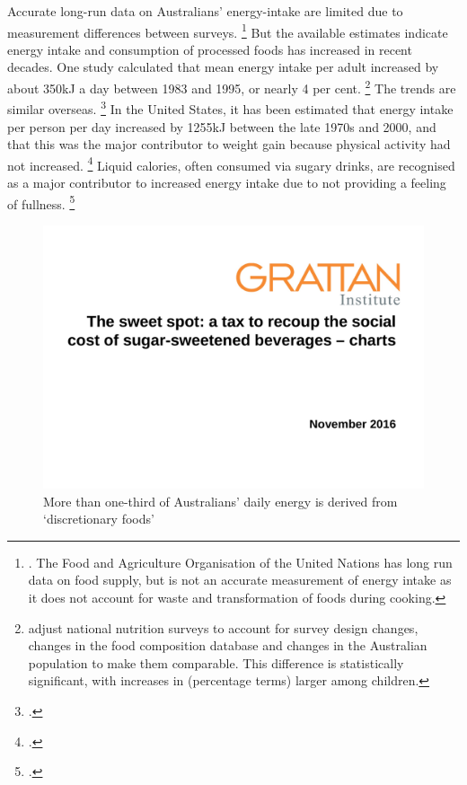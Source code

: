 \documentclass[embargoed]{grattan}
\begin{document}
Accurate long-run data on Australians' energy-intake are limited due to measurement differences between surveys.%
\footnote{\textcites{Health2012Australiasfood}{Bleich2007Whyisdeveloped}.
The Food and Agriculture Organisation of the United Nations has long run data on food supply, but is not an accurate measurement of energy intake as it does not account for waste and transformation of foods during cooking.} But the available estimates indicate energy intake and consumption of processed foods has increased in recent decades.
One study calculated that mean energy intake per adult increased by about 350kJ a day between 1983 and 1995, or nearly 4 per cent.%
\footnote{\textcite{Cook2001Comparabledatafood} adjust national nutrition surveys to account for survey design changes, changes in the food composition database and changes in the Australian population to make them comparable.
This difference is statistically significant, with increases in (percentage terms) larger among children.} The trends are similar overseas.%
\footcites{Cavadini2000USadolescentfood}{Nielsen2002Trendsenergyintake}{Bleich2007Whyisdeveloped} In the United States, it has been estimated that energy intake per person per day increased by 1255kJ between the late 1970s and 2000, and that this was the major contributor to weight gain because physical activity had not increased.%
\footcite{Woodward-Lopez2010whatextenthave} Liquid calories, often consumed via sugary drinks, are recognised as a major contributor to increased energy intake due to not providing a feeling of fullness.%
\footcites{Woodward-Lopez2010whatextenthave}{Johnson2009Dietarysugarsintake}

\begin{figure}
\caption{More than one-third of Australians' daily energy is derived from `discretionary foods'}

\includegraphics[page=6]{atlas/ObesityCharts}


\end{figure}
\end{document}
